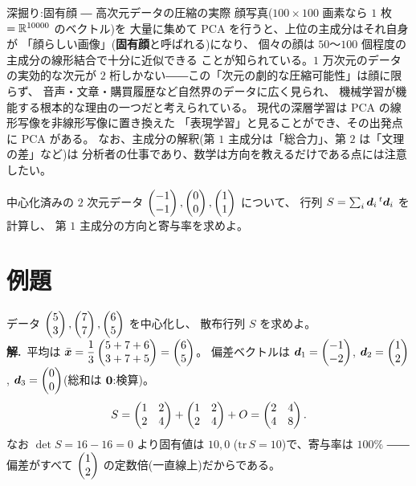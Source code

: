 \begin{itembox}[l]{深掘り:固有顔 ― 高次元データの圧縮の実際}
顔写真($100 \times 100$ 画素なら $1$ 枚 $= \mathbb{R}^{10000}$ のベクトル)を
大量に集めて PCA を行うと、上位の主成分はそれ自身が
「顔らしい画像」(\textbf{固有顔}と呼ばれる)になり、
個々の顔は $50$〜$100$ 個程度の主成分の線形結合で十分に近似できる
ことが知られている。$1$ 万次元のデータの実効的な次元が
$2$ 桁しかない――この「次元の劇的な圧縮可能性」は顔に限らず、
音声・文章・購買履歴など自然界のデータに広く見られ、
機械学習が機能する根本的な理由の一つだと考えられている。
現代の深層学習は PCA の線形写像を非線形写像に置き換えた
「表現学習」と見ることができ、その出発点に PCA がある。
なお、主成分の解釈(第 $1$ 主成分は「総合力」、第 $2$ は「文理の差」など)は
分析者の仕事であり、数学は方向を教えるだけである点には注意したい。
\end{itembox}

\begin{mondai}\label{q:pca}
中心化済みの $2$ 次元データ
$\begin{pmatrix}-1 \\ -1\end{pmatrix}, \begin{pmatrix}0 \\ 0\end{pmatrix}, \begin{pmatrix}1 \\ 1\end{pmatrix}$ について、
行列 $S = \sum_i \bm{d}_i\,{}^t\bm{d}_i$ を計算し、
第 $1$ 主成分の方向と寄与率を求めよ。
\end{mondai}

\section{例題}

\begin{rei}[例題・基本(中心化と散布行列)]\label{rei:pca-basic1}
データ $\begin{pmatrix}5 \\ 3\end{pmatrix}, \begin{pmatrix}7 \\ 7\end{pmatrix}, \begin{pmatrix}6 \\ 5\end{pmatrix}$ を中心化し、
散布行列 $S$ を求めよ。\\
\textbf{解.}\ 平均は
$\bar{\bm{x}} = \dfrac{1}{3}\begin{pmatrix}5 + 7 + 6 \\ 3 + 7 + 5\end{pmatrix} = \begin{pmatrix}6 \\ 5\end{pmatrix}$。
偏差ベクトルは
$\bm{d}_1 = \begin{pmatrix}-1 \\ -2\end{pmatrix}$, $\bm{d}_2 = \begin{pmatrix}1 \\ 2\end{pmatrix}$,
$\bm{d}_3 = \begin{pmatrix}0 \\ 0\end{pmatrix}$(総和は $\bm{0}$:検算)。
\[
S = \begin{pmatrix}1 & 2 \\ 2 & 4\end{pmatrix} + \begin{pmatrix}1 & 2 \\ 2 & 4\end{pmatrix} + O
= \begin{pmatrix}2 & 4 \\ 4 & 8\end{pmatrix}.
\]
なお $\det S = 16 - 16 = 0$ より固有値は $10, 0$
($\mathrm{tr}\,S = 10$)で、寄与率は $100\%$
――偏差がすべて $\begin{pmatrix}1 \\ 2\end{pmatrix}$ の定数倍(一直線上)だからである。
\end{rei}

